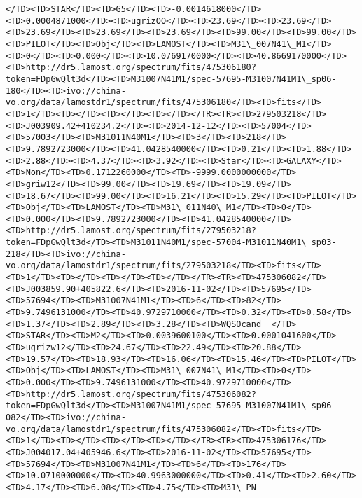 \documentclass[11pt]{article}
\begin{document}
\begin{Verbatim}[commandchars=\\\{\}]
</TD><TD>STAR</TD><TD>G5</TD><TD>-0.0014618000</TD><TD>0.0004871000</TD><TD>ugrizOO</TD><TD>23.69</TD><TD>23.69</TD><TD>23.69</TD><TD>23.69</TD><TD>23.69</TD><TD>99.00</TD><TD>99.00</TD><TD>PILOT</TD><TD>Obj</TD><TD>LAMOST</TD><TD>M31\_007N41\_M1</TD><TD>0</TD><TD>0.000</TD><TD>10.0769170000</TD><TD>40.8669170000</TD><TD>http://dr5.lamost.org/spectrum/fits/475306180?token=FDpGwQlt3d</TD><TD>M31007N41M1/spec-57695-M31007N41M1\_sp06-180</TD><TD>ivo://china-vo.org/data/lamostdr1/spectrum/fits/475306180</TD><TD>fits</TD><TD>1</TD><TD></TD><TD></TD><TD></TD></TR><TR><TD>279503218</TD><TD>J003909.42+410234.2</TD><TD>2014-12-12</TD><TD>57004</TD><TD>57003</TD><TD>M31011N40M1</TD><TD>3</TD><TD>218</TD><TD>9.7892723000</TD><TD>41.0428540000</TD><TD>0.21</TD><TD>1.88</TD><TD>2.88</TD><TD>4.37</TD><TD>3.92</TD><TD>Star</TD><TD>GALAXY</TD><TD>Non</TD><TD>0.1712260000</TD><TD>-9999.0000000000</TD><TD>griw12</TD><TD>99.00</TD><TD>19.69</TD><TD>19.09</TD><TD>18.67</TD><TD>99.00</TD><TD>16.21</TD><TD>15.29</TD><TD>PILOT</TD><TD>Obj</TD><TD>LAMOST</TD><TD>M31\_011N40\_M1</TD><TD>0</TD><TD>0.000</TD><TD>9.7892723000</TD><TD>41.0428540000</TD><TD>http://dr5.lamost.org/spectrum/fits/279503218?token=FDpGwQlt3d</TD><TD>M31011N40M1/spec-57004-M31011N40M1\_sp03-218</TD><TD>ivo://china-vo.org/data/lamostdr1/spectrum/fits/279503218</TD><TD>fits</TD><TD>1</TD><TD></TD><TD></TD><TD></TD></TR><TR><TD>475306082</TD><TD>J003859.90+405822.6</TD><TD>2016-11-02</TD><TD>57695</TD><TD>57694</TD><TD>M31007N41M1</TD><TD>6</TD><TD>82</TD><TD>9.7496131000</TD><TD>40.9729710000</TD><TD>0.32</TD><TD>0.58</TD><TD>1.37</TD><TD>2.89</TD><TD>3.28</TD><TD>WQSOcand  </TD><TD>STAR</TD><TD>M2</TD><TD>0.0039600100</TD><TD>0.0001041600</TD><TD>ugrizw12</TD><TD>24.67</TD><TD>22.49</TD><TD>20.88</TD><TD>19.57</TD><TD>18.93</TD><TD>16.06</TD><TD>15.46</TD><TD>PILOT</TD><TD>Obj</TD><TD>LAMOST</TD><TD>M31\_007N41\_M1</TD><TD>0</TD><TD>0.000</TD><TD>9.7496131000</TD><TD>40.9729710000</TD><TD>http://dr5.lamost.org/spectrum/fits/475306082?token=FDpGwQlt3d</TD><TD>M31007N41M1/spec-57695-M31007N41M1\_sp06-082</TD><TD>ivo://china-vo.org/data/lamostdr1/spectrum/fits/475306082</TD><TD>fits</TD><TD>1</TD><TD></TD><TD></TD><TD></TD></TR><TR><TD>475306176</TD><TD>J004017.04+405946.6</TD><TD>2016-11-02</TD><TD>57695</TD><TD>57694</TD><TD>M31007N41M1</TD><TD>6</TD><TD>176</TD><TD>10.0710000000</TD><TD>40.9963000000</TD><TD>0.41</TD><TD>2.60</TD><TD>4.17</TD><TD>6.08</TD><TD>4.75</TD><TD>M31\_PN    
\end{Verbatim}
\end{document}
